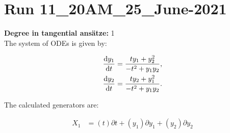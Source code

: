 \section*{Run 11\_20AM\_25\_June-2021}
\textbf{Degree in tangential ansätze:}	1\\
The system of ODEs is given by:

\begin{align*}
\dv{y_{1}}{t}&=\frac{t y_{1} + y_{2}^{2}}{- t^{2} + y_{1} y_{2}},\\
\dv{y_{2}}{t}&=\frac{t y_{2} + y_{1}^{2}}{- t^{2} + y_{1} y_{2}}.\\
\end{align*}

\noindent The calculated generators are:

\begin{align*}
X_{1}&=\left( t \right)\partial t+\left( y_{1} \right)\partial y_{1}+\left( y_{2} \right)\partial y_{2}\end{align*}
